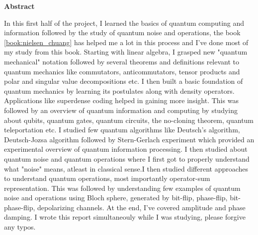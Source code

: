 \thispagestyle{plain}
\begin{center}
    \Large
    \textbf{Abstract}
\end{center}
In this first half of the project, I learned the basics of quantum computing and information followed by the study of quantum noise and operations, the book \ref{book:nielsen_chuang} has helped me a lot in this process and I've done most of my study from this book. Starting with linear algebra, I grasped new "quantum mechanical" notation followed by several theorems and definitions relevant to quantum mechanics like commutators, anticommutators, tensor products and polar and singular value decompositions etc. I then  built a basic foundation of quantum mechanics by learning its postulates along with density operators. Applications like superdense coding helped in gaining more insight. This was followed by an overview of quantum information and computing by studying about qubits, quantum gates, quantum circuits, the no-cloning theorem, quantum teleportation etc. I studied few quantum algorithms like Deutsch's algorithm, Deutsch-Jozsa algorithm followed by Stern-Gerlach experiment which provided an experimental overview of quantum information processing. I then studied about quantum noise and quantum operations where I first got to properly understand what "noise" means, atleast in classical sense.I then studied different approaches to understand quantum operations, most importantly operator-sum representation. This was followed by understanding few examples of quantum noise and operations using Bloch sphere, generated by bit-flip, phase-flip, bit-phase-flip, depolarizing channels. At the end, I've covered amplitude and phase damping. I wrote this report simultaneouly while I was studying, please forgive any typos.
